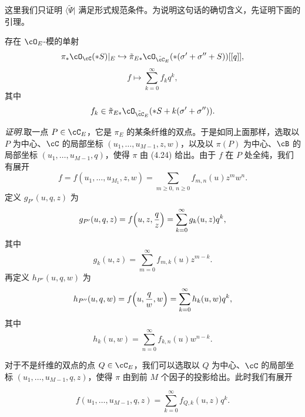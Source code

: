 这里我们只证明 $\langle\tilde\Psi|$ 满足形式规范条件。为说明这句话的确切含义，先证明下面的引理。

\begin{lemma}[4.16]
存在 $\cO_E$-模的单射
\[
 \pi_*\cO_{\cC}(*S)|_E\hookrightarrow\tilde\pi_{E*}\cO_{\tilde\cC_E}(*(\sigma'+\sigma''+S))[[q]],
\]
\[
 f\mapsto\sum_{k=0}^{\infty}f_kq^k,
\]
其中
\[
 f_k\in\tilde\pi_{E*}\cO_{\tilde\cC_E}(*S+k(\sigma'+\sigma'')).
\]
\end{lemma}

\noindent\textit{证明.}\quad 取一点 $P\in\cC_E$，它是 $\pi_E$ 的某条纤维的双点。于是如同上面那样，选取以 $P$ 为中心、$\cC$ 的局部坐标 $(u_1,\dots,u_{M-1},z,w)$，以及以 $\pi(P)$ 为中心、$\cB$ 的局部坐标 $(u_1,\dots,u_{M-1},q)$，使得 $\pi$ 由 (4.24) 给出。由于 $f$ 在 $P$ 处全纯，我们有展开
\[
 f=f(u_1,\dots,u_{M_1},z,w)=\sum_{m\ge 0,\ n\ge 0}f_{m,n}(u)z^mw^n.
\]
定义 $g_{P'}(u,q,z)$ 为
\[
 g_{P'}(u,q,z)=f\Bigl(u,z,\frac{q}{z}\Bigr)=\sum_{k=0}^{\infty}g_k(u,z)q^k,
\]
其中
\begin{equation}
 g_k(u,z)=\sum_{m=0}^{\infty}f_{m,k}(u)z^{m-k}. \tag{4.27}
\end{equation}
再定义 $h_{P''}(u,q,w)$ 为
\[
 h_{P''}(u,q,w)=f\Bigl(u,\frac{q}{w},w\Bigr)=\sum_{k=0}^{\infty}h_k(u,w)q^k,
\]
其中
\begin{equation}
 h_k(u,w)=\sum_{n=0}^{\infty}f_{k,n}(u)w^{n-k}. \tag{4.28}
\end{equation}



{\emergencystretch=28.3pt 对于不是纤维的双点的点 $Q\in\cC_E$，我们可以选取以 $Q$ 为中心、$\cC$ 的局部坐标 $(u_1,\dots,u_{M-1},q,z)$，使得 $\pi$ 由到前 $M$ 个因子的投影给出。此时我们有展开\par}
\[
 f(u_1,\dots,u_{M-1},q,z)=\sum_{k=0}^{\infty}f_{Q,k}(u,z)q^k.
\]

